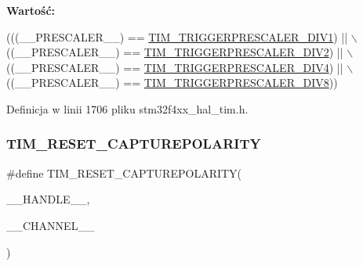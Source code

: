 {\bfseries Wartość\+:}
\begin{DoxyCode}
(((\_\_PRESCALER\_\_) == \hyperlink{group___t_i_m___trigger___prescaler_ga02ab6f24e367cd972a1e0c1df326a7a3}{TIM\_TRIGGERPRESCALER\_DIV1}) || \(\backslash\)
                                                ((\_\_PRESCALER\_\_) == 
      \hyperlink{group___t_i_m___trigger___prescaler_ga1350c5659a17a66df69b444871907d83}{TIM\_TRIGGERPRESCALER\_DIV2}) || \(\backslash\)
                                                ((\_\_PRESCALER\_\_) == 
      \hyperlink{group___t_i_m___trigger___prescaler_ga195dd56e15ea4733e19518fb431dfb8d}{TIM\_TRIGGERPRESCALER\_DIV4}) || \(\backslash\)
                                                ((\_\_PRESCALER\_\_) == 
      \hyperlink{group___t_i_m___trigger___prescaler_ga78edbcf4caf228de0daa4b7f698f578f}{TIM\_TRIGGERPRESCALER\_DIV8}))
\end{DoxyCode}


Definicja w linii 1706 pliku stm32f4xx\+\_\+hal\+\_\+tim.\+h.

\mbox{\label{group___t_i_m___private___macros_gada7535acf7e1f9b3e8e1dcca848871db}} 
\subsubsection{\texorpdfstring{T\+I\+M\+\_\+\+R\+E\+S\+E\+T\+\_\+\+C\+A\+P\+T\+U\+R\+E\+P\+O\+L\+A\+R\+I\+TY}{TIM\_RESET\_CAPTUREPOLARITY}}
{\footnotesize\ttfamily \#define T\+I\+M\+\_\+\+R\+E\+S\+E\+T\+\_\+\+C\+A\+P\+T\+U\+R\+E\+P\+O\+L\+A\+R\+I\+TY(\begin{DoxyParamCaption}\item[{}]{\+\_\+\+\_\+\+H\+A\+N\+D\+L\+E\+\_\+\+\_\+,  }\item[{}]{\+\_\+\+\_\+\+C\+H\+A\+N\+N\+E\+L\+\_\+\+\_\+ }\end{DoxyParamCaption})}

